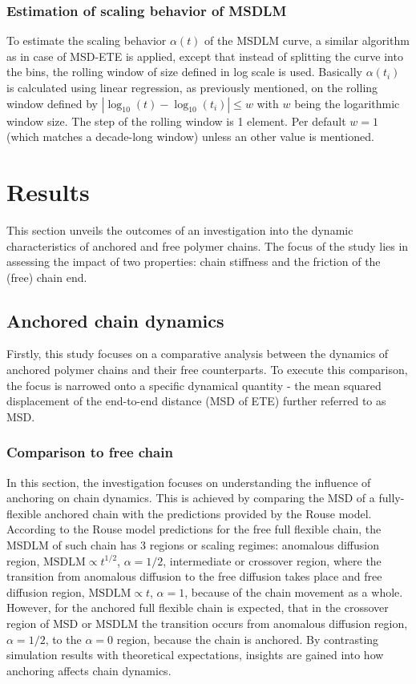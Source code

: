 \documentclass[
    paper=A4,pagesize=automedia,fontsize=12pt,
    BCOR=15mm,DIV=22,
    twoside,headinclude,footinclude=false,
    fleqn,             %
    bibliography=totocnumbered,          %
    listof=totoc,                %
    listof=flat,                 %
    cleardoublepage=empty      %
    numbers=endperiod
]{scrartcl}
\begin{document}
\subsubsection{Estimation of scaling behavior of MSDLM} \label{sec:est-alpha-msdlm}
To estimate the scaling behavior $\alpha(t)$ of the MSDLM curve, a similar
algorithm as in case of MSD-ETE is applied, except that instead of
splitting the curve into the bins, the rolling window of size defined in log scale is used.
Basically $\alpha(t_i)$ is calculated using linear regression, as previously
mentioned, on the rolling window defined by $|\log_{10}(t)-\log_{10}(t_i)| \le w$
with $w$ being the logarithmic window size. The step of the rolling window is 1 element.
Per default $w = 1$ (which matches a decade-long window) 
unless an other value is mentioned.

\section{Results}
This section unveils the outcomes of an investigation into the dynamic
characteristics of anchored and free polymer chains. 
The focus of the study lies in assessing the impact 
of two properties: chain stiffness and the friction of the (free) chain end.

\subsection{Anchored chain dynamics}
Firstly, this study focuses on a comparative analysis between the 
dynamics of anchored polymer chains and their free counterparts.
To execute this comparison, the focus is narrowed onto a specific dynamical
quantity - the mean squared displacement of the end-to-end distance (MSD of ETE)
further referred to as MSD.

\subsubsection{Comparison to free chain} \label{sec:comp_to_free_chain}

In this section, the investigation focuses on understanding 
the influence of anchoring on chain dynamics. 
This is achieved by comparing the MSD of a fully-flexible anchored 
chain with the predictions provided by the Rouse model.
According to the Rouse model predictions for the free full flexible chain, the MSDLM
of such chain has 3 regions or scaling regimes: anomalous diffusion region,
$\text{MSDLM} \propto t^{1/2}$, $\alpha=1/2$, intermediate or crossover region, where the transition
from anomalous diffusion to the free diffusion takes place and free diffusion region, 
$\text{MSDLM} \propto t$, $\alpha=1$, because of the chain movement as a whole. 
However, for the anchored full flexible chain
is expected, that in the crossover region of MSD or MSDLM the transition occurs from 
anomalous diffusion region, $\alpha=1/2$, to the $\alpha=0$ region, because the chain 
is anchored. By contrasting simulation results with theoretical
expectations, insights are gained into how anchoring 
affects chain dynamics.
\end{document}
